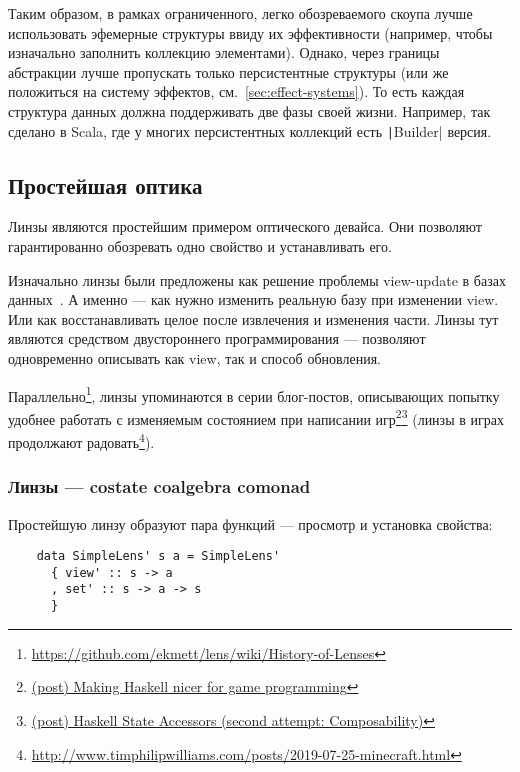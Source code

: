 Таким образом, в рамках ограниченного, легко обозреваемого скоупа лучше использовать эфемерные структуры ввиду их эффективности (например, чтобы изначально заполнить коллекцию элементами).
Однако, через границы абстракции лучше пропускать только персистентные структуры (или же положиться на систему эффектов, см.~\ref{sec:effect-systems}).
То есть каждая структура данных должна поддерживать две фазы своей жизни.
Например, так сделано в Scala, где у многих персистентных коллекций есть \texttt|Builder| версия.

\subsection{Простейшая оптика}

Линзы являются простейшим примером оптического девайса.
Они позволяют гарантированно обозревать одно свойство и устанавливать его.

Изначально линзы были предложены как решение проблемы view-update в базах данных~\cite{bohannon2006relational, foster2008quotient}.
А именно --- как нужно изменить реальную базу при изменении view.
Или как восстанавливать целое после извлечения и изменения части.
Линзы тут являются средством двустороннего программирования --- позволяют одновременно описывать как view, так и способ обновления.

Параллельно\footnote{\url{https://github.com/ekmett/lens/wiki/History-of-Lenses}}, линзы упоминаются в серии блог-постов, описывающих попытку удобнее работать с изменяемым состоянием при написании игр\footnote{\href{https://web.archive.org/web/20140402193032/https://lukepalmer.wordpress.com/2007/07/26/making-haskell-nicer-for-game-programming/}{(post) Making Haskell nicer for game programming}}\footnote{\href{https://web.archive.org/web/20120303223802/https://lukepalmer.wordpress.com/2007/08/05/haskell-state-accessors-second-attempt-composability/}{(post) Haskell State Accessors (second attempt: Composability)}} (линзы в играх продолжают радовать\footnote{\url{http://www.timphilipwilliams.com/posts/2019-07-25-minecraft.html}}).

\subsubsection{Линзы --- costate coalgebra comonad}


Простейшую линзу образуют пара функций --- просмотр и установка свойства:
\begin{verbatim}
    data SimpleLens' s a = SimpleLens'
      { view' :: s -> a
      , set' :: s -> a -> s
      }
\end{verbatim}

